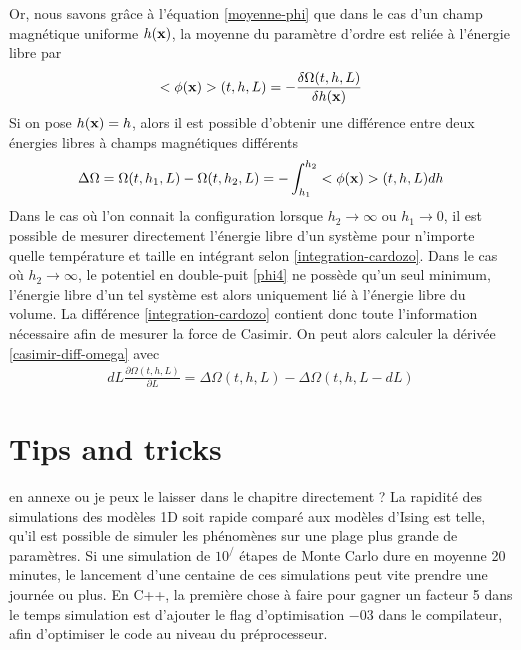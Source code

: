Or, nous savons grâce à l'équation \ref{moyenne-phi} que dans le cas d'un champ magnétique uniforme $h({\bf x})$, la moyenne du paramètre d'ordre est reliée à l'énergie libre par
\begin{align}
    <\phi({\bf x})>(t,h,L) = - \frac{\delta \Omega(t,h,L)}{\delta h({\bf x})}
\end{align} 
Si on pose $h({\bf x}) = h$, alors il est possible d'obtenir une différence entre deux énergies libres à champs magnétiques différents \cite{lopes_cardozo_critical_2014} 
\begin{align}
    \Delta \Omega = \Omega(t,h_1,L) - \Omega(t,h_2,L) = - \int_{h_1}^{h_2} <\phi({\bf x})>(t,h,L) dh
    \label{integration-cardozo}
\end{align}
Dans le cas où l'on connait la configuration lorsque $h_2 \to \infty$ ou $h_1 \to 0$, il est possible de mesurer directement l'énergie libre d'un système pour n'importe quelle température et taille en intégrant selon \ref{integration-cardozo}. Dans le cas où $h_2 \to \infty$, le potentiel en double-puit \ref{phi4} ne possède qu'un seul minimum, l'énergie libre d'un tel système est alors uniquement lié à l'énergie libre du volume.
La différence \ref{integration-cardozo} contient donc toute l'information nécessaire afin de mesurer la force de Casimir. On peut alors calculer la dérivée \ref{casimir-diff-omega} avec
\begin{align}
    dL \frac{\partial \Omega(t,h,L)}{\partial L} = \Delta \Omega(t,h,L)-\Delta \Omega(t,h,L-dL)
\end{align}

    \section{Tips and tricks}
    {\color{red} en annexe ou je peux le laisser dans le chapitre directement ? }
    La rapidité des simulations des modèles 1D soit rapide comparé aux modèles d'Ising est telle, qu'il est possible de simuler les phénomènes sur une plage plus grande de paramètres. Si une simulation de $10^/$ étapes de Monte Carlo dure en moyenne 20 minutes, le lancement d'une centaine de ces simulations peut vite prendre une journée ou plus.
    En C++, la première chose à faire pour gagner un facteur 5 dans le temps simulation est d'ajouter le flag d'optimisation $-03$ dans le compilateur, afin d'optimiser le code au niveau du préprocesseur. 
    
